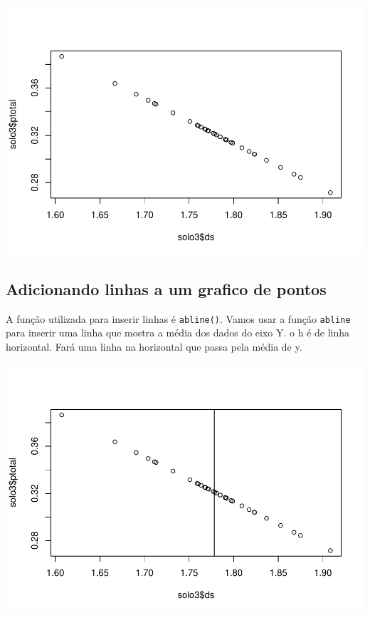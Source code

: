 \documentclass[
]{book}
\newenvironment{Shaded}{\begin{snugshade}}{\end{snugshade}}
\newcommand{\DataTypeTok}[1]{\textcolor[rgb]{0.13,0.29,0.53}{#1}}
\newcommand{\KeywordTok}[1]{\textcolor[rgb]{0.13,0.29,0.53}{\textbf{#1}}}
\newcommand{\NormalTok}[1]{#1}
\newcommand{\OperatorTok}[1]{\textcolor[rgb]{0.81,0.36,0.00}{\textbf{#1}}}
\begin{document}
\includegraphics{TudodoR_files/figure-latex/unnamed-chunk-161-1.pdf}

\hypertarget{adicionando-linhas-a-um-grafico-de-pontos}{%
\subsection{Adicionando linhas a um grafico de pontos}\label{adicionando-linhas-a-um-grafico-de-pontos}}

A função utilizada para inserir linhas é \texttt{abline()}.
Vamos usar a função \texttt{abline} para inserir uma linha que mostra a média dos dados do eixo Y.
o h é de linha horizontal. Fará uma linha na horizontal que passa pela média de y.

\begin{Shaded}
\end{Shaded}

\includegraphics{TudodoR_files/figure-latex/unnamed-chunk-162-1.pdf}
\end{document}
